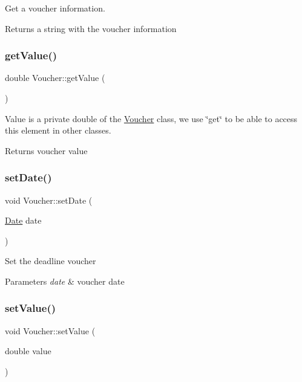 Get a voucher information. \begin{DoxyReturn}{Returns}
a string with the voucher information 
\end{DoxyReturn}
\hypertarget{classVoucher_a1fa7c64bf3bada3b425a05fd43311519}{}\label{classVoucher_a1fa7c64bf3bada3b425a05fd43311519} 
\subsubsection{\texorpdfstring{get\+Value()}{getValue()}}
{\footnotesize\ttfamily double Voucher\+::get\+Value (\begin{DoxyParamCaption}{ }\end{DoxyParamCaption})}

Value is a private double of the \hyperlink{classVoucher}{Voucher} class, we use \char`\"{}get\char`\"{} to be able to access this element in other classes. \begin{DoxyReturn}{Returns}
voucher value 
\end{DoxyReturn}
\hypertarget{classVoucher_a1db87fd0a6b0ec16825c52a6f24fa4b1}{}\label{classVoucher_a1db87fd0a6b0ec16825c52a6f24fa4b1} 
\subsubsection{\texorpdfstring{set\+Date()}{setDate()}}
{\footnotesize\ttfamily void Voucher\+::set\+Date (\begin{DoxyParamCaption}\item[{\hyperlink{classDate}{Date}}]{date }\end{DoxyParamCaption})}

Set the deadline voucher 
\begin{DoxyParams}{Parameters}
{\em date} & voucher date \\
\hline
\end{DoxyParams}
\hypertarget{classVoucher_a75ecfe9594cdbc6bcf6c38326672d040}{}\label{classVoucher_a75ecfe9594cdbc6bcf6c38326672d040} 
\subsubsection{\texorpdfstring{set\+Value()}{setValue()}}
{\footnotesize\ttfamily void Voucher\+::set\+Value (\begin{DoxyParamCaption}\item[{double}]{value }\end{DoxyParamCaption})}


